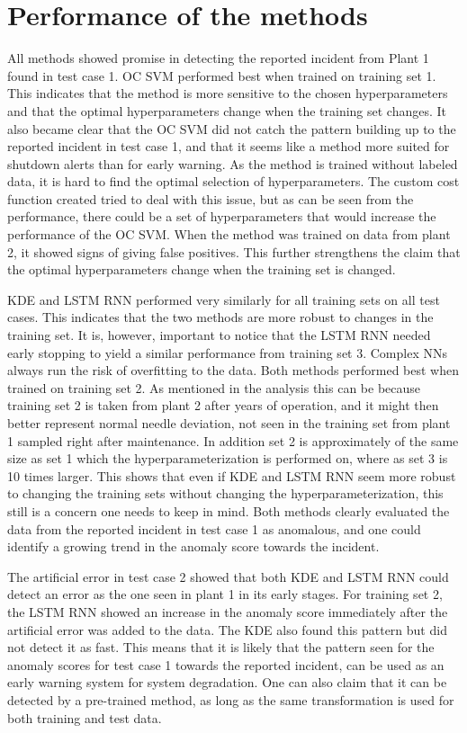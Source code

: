 \section{Performance of the methods}
    All methods showed promise in detecting the reported incident from Plant 1 found in test case 1. OC SVM performed best when trained on training set 1. This indicates that the method is more sensitive to the chosen hyperparameters and that the optimal hyperparameters change when the training set changes. It also became clear that the OC SVM did not catch the pattern building up to the reported incident in test case 1, and that it seems like a method more suited for shutdown alerts than for early warning. As the method is trained without labeled data, it is hard to find the optimal selection of hyperparameters. The custom cost function created tried to deal with this issue, but as can be seen from the performance, there could be a set of hyperparameters that would increase the performance of the OC SVM. When the method was trained on data from plant 2, it showed signs of giving false positives. This further strengthens the claim that the optimal hyperparameters change when the training set is changed. 
    
    KDE and LSTM RNN performed very similarly for all training sets on all test cases. This indicates that the two methods are more robust to changes in the training set. It is, however, important to notice that the LSTM RNN needed early stopping to yield a similar performance from training set 3. Complex NNs always run the risk of overfitting to the data. Both methods performed best when trained on training set 2. As mentioned in the analysis this can be because training set 2 is taken from plant 2 after years of operation, and it might then better represent normal needle deviation, not seen in the training set from plant 1 sampled right after maintenance. In addition set 2 is approximately of the same size as set 1 which the hyperparameterization is performed on, where as set 3 is 10 times larger. This shows that even if KDE and LSTM RNN seem more robust to changing the training sets without changing the hyperparameterization, this still is a concern one needs to keep in mind. Both methods clearly evaluated the data from the reported incident in test case 1 as anomalous, and one could identify a growing trend in the anomaly score towards the incident.   
    
    The artificial error in test case 2 showed that both KDE and LSTM RNN could detect an error as the one seen in plant 1 in its early stages. For training set 2, the LSTM RNN showed an increase in the anomaly score immediately after the artificial error was added to the data. The KDE also found this pattern but did not detect it as fast. This means that it is likely that the pattern seen for the anomaly scores for test case 1 towards the reported incident, can be used as an early warning system for system degradation. One can also claim that it can be detected by a pre-trained method, as long as the same transformation is used for both training and test data.  
    

